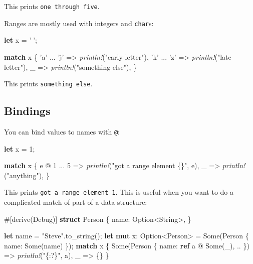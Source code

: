 \documentclass[a4paper,]{book}
\newenvironment{Shaded}{\begin{snugshade}}{\end{snugshade}}
\newcommand{\KeywordTok}[1]{\textcolor[rgb]{0.13,0.29,0.53}{\textbf{{#1}}}}
\newcommand{\DataTypeTok}[1]{\textcolor[rgb]{0.13,0.29,0.53}{{#1}}}
\newcommand{\DecValTok}[1]{\textcolor[rgb]{0.00,0.00,0.81}{{#1}}}
\newcommand{\ConstantTok}[1]{\textcolor[rgb]{0.00,0.00,0.00}{{#1}}}
\newcommand{\CharTok}[1]{\textcolor[rgb]{0.31,0.60,0.02}{{#1}}}
\newcommand{\StringTok}[1]{\textcolor[rgb]{0.31,0.60,0.02}{{#1}}}
\newcommand{\BuiltInTok}[1]{{#1}}
\newcommand{\PreprocessorTok}[1]{\textcolor[rgb]{0.56,0.35,0.01}{\textit{{#1}}}}
\newcommand{\AttributeTok}[1]{\textcolor[rgb]{0.77,0.63,0.00}{{#1}}}
\newcommand{\NormalTok}[1]{{#1}}
\begin{document}
This prints \texttt{one\ through\ five}.

Ranges are mostly used with integers and \texttt{char}s:

\begin{Shaded}
\begin{Highlighting}[]
\KeywordTok{let} \NormalTok{x = }\CharTok{'💅'}\NormalTok{;}

\KeywordTok{match} \NormalTok{x \{}
    \CharTok{'a'} \NormalTok{... }\CharTok{'j'} \NormalTok{=> }\PreprocessorTok{println!}\NormalTok{(}\StringTok{"early letter"}\NormalTok{),}
    \CharTok{'k'} \NormalTok{... }\CharTok{'z'} \NormalTok{=> }\PreprocessorTok{println!}\NormalTok{(}\StringTok{"late letter"}\NormalTok{),}
    \NormalTok{_ => }\PreprocessorTok{println!}\NormalTok{(}\StringTok{"something else"}\NormalTok{),}
\NormalTok{\}}
\end{Highlighting}
\end{Shaded}

This prints \texttt{something\ else}.

\subsection{Bindings}\label{bindings}

You can bind values to names with \texttt{@}:

\begin{Shaded}
\begin{Highlighting}[]
\KeywordTok{let} \NormalTok{x = }\DecValTok{1}\NormalTok{;}

\KeywordTok{match} \NormalTok{x \{}
    \NormalTok{e @ }\DecValTok{1} \NormalTok{... }\DecValTok{5} \NormalTok{=> }\PreprocessorTok{println!}\NormalTok{(}\StringTok{"got a range element \{\}"}\NormalTok{, e),}
    \NormalTok{_ => }\PreprocessorTok{println!}\NormalTok{(}\StringTok{"anything"}\NormalTok{),}
\NormalTok{\}}
\end{Highlighting}
\end{Shaded}

This prints \texttt{got\ a\ range\ element\ 1}. This is useful when you
want to do a complicated match of part of a data structure:

\begin{Shaded}
\begin{Highlighting}[]
\AttributeTok{#[}\NormalTok{derive}\AttributeTok{(}\BuiltInTok{Debug}\AttributeTok{)]}
\KeywordTok{struct} \NormalTok{Person \{}
    \NormalTok{name: }\DataTypeTok{Option}\NormalTok{<}\DataTypeTok{String}\NormalTok{>,}
\NormalTok{\}}

\KeywordTok{let} \NormalTok{name = }\StringTok{"Steve"}\NormalTok{.to_string();}
\KeywordTok{let} \KeywordTok{mut} \NormalTok{x: }\DataTypeTok{Option}\NormalTok{<Person> = }\ConstantTok{Some}\NormalTok{(Person \{ name: }\ConstantTok{Some}\NormalTok{(name) \});}
\KeywordTok{match} \NormalTok{x \{}
    \ConstantTok{Some}\NormalTok{(Person \{ name: }\KeywordTok{ref} \NormalTok{a @ }\ConstantTok{Some}\NormalTok{(_), .. \}) => }\PreprocessorTok{println!}\NormalTok{(}\StringTok{"\{:?\}"}\NormalTok{, a),}
    \NormalTok{_ => \{\}}
\NormalTok{\}}
\end{Highlighting}
\end{Shaded}
\end{document}
